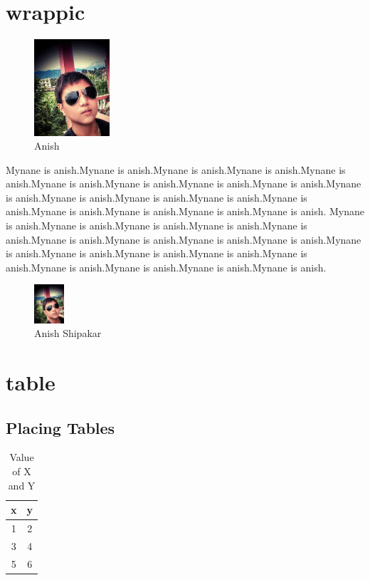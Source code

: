 \documentclass[12pt]{report}
\begin{document}
\chapter{wrappic}

\begin{figure}
\centering
\includegraphics[width = 0.25\textwidth]{Anish.jpg}
\caption{Anish}
\end{figure}
Mynane is anish.Mynane is anish.Mynane is anish.Mynane is anish.Mynane is anish.Mynane is anish.Mynane is anish.Mynane is anish.Mynane is anish.Mynane is anish.Mynane is anish.Mynane is anish.Mynane is anish.Mynane is anish.Mynane is anish.Mynane is anish.Mynane is anish.Mynane is anish.
Mynane is anish.Mynane is anish.Mynane is anish.Mynane is anish.Mynane is anish.Mynane is anish.Mynane is anish.Mynane is anish.Mynane is anish.Mynane is anish.Mynane is anish.Mynane is anish.Mynane is anish.Mynane is anish.Mynane is anish.Mynane is anish.Mynane is anish.Mynane is anish.
\begin{figure}[!hbt]
\centering
\includegraphics[width=0.1\textwidth]{Anish.jpg}
\caption{Anish Shipakar}
\end{figure}


\chapter{table}
\section{Placing Tables}
\begin{table}[!hbt]
\centering
\caption{Value of X and Y}
\begin{tabular}{|c|c|}
\hline      %
x & y\\
\hline
1 & 2\\
\hline
3 & 4\\
\hline
5 & 6\\
\hline
\end{tabular}
\end{table}
\end{document}
